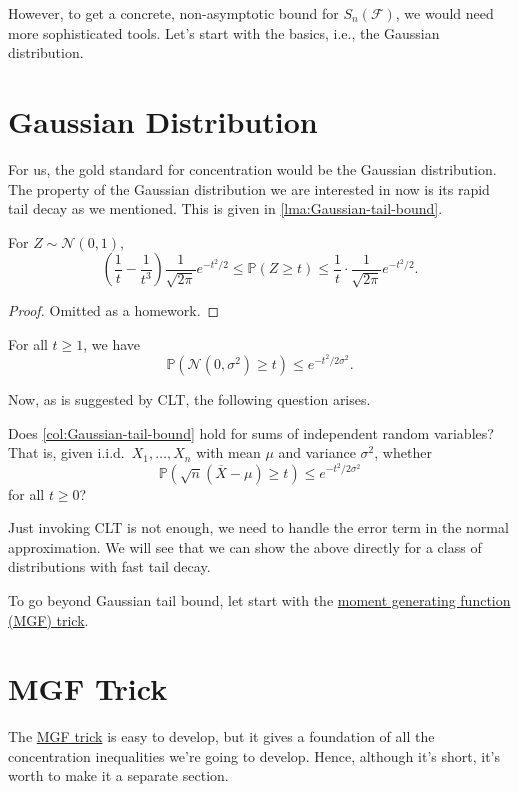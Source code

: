 However, to get a concrete, non-asymptotic bound for \(S_n(\mathscr{F} )\), we would need more sophisticated tools. Let's start with the basics, i.e., the Gaussian distribution.

\section{Gaussian Distribution}
For us, the gold standard for concentration would be the Gaussian distribution. The property of the Gaussian distribution we are interested in now is its rapid tail decay as we mentioned. This is given in \autoref{lma:Gaussian-tail-bound}.

\begin{lemma}\label{lma:Gaussian-tail-bound}
	For \(Z \sim \mathcal{N} (0, 1)\),
	\[
		\left( \frac{1}{t} - \frac{1}{t^3} \right) \frac{1}{\sqrt{2\pi } } e^{- t^2 / 2} \leq \mathbb{P}(Z \geq t) \leq \frac{1}{t} \cdot \frac{1}{\sqrt{2\pi } } e^{- t^2 / 2}.
	\]
\end{lemma}
\begin{proof}
	Omitted as a homework.
\end{proof}
\begin{corollary}\label{col:Gaussian-tail-bound}
	For all \(t \geq 1\), we have
	\[
		\mathbb{P} (\mathcal{N} (0, \sigma ^{2} ) \geq t) \leq e^{-t^2 / 2\sigma ^{2} }.
	\]
\end{corollary}

Now, as is suggested by CLT, the following question arises.

\begin{problem*}
	Does \autoref{col:Gaussian-tail-bound} hold for sums of independent random variables? That is, given i.i.d.\ \(X_1, \dots , X_n\) with mean \(\mu \) and variance \(\sigma ^{2} \), whether
	\[
		\mathbb{P} (\sqrt{n}(\overline{X} - \mu ) \geq t )\leq e^{-t^2 / 2 \sigma ^{2} }
	\]
	for all \(t \geq 0\)?
\end{problem*}
\begin{answer}
	Just invoking CLT is not enough, we need to handle the error term in the normal approximation. We will see that we can show the above directly for a class of distributions with fast tail decay.
\end{answer}

To go beyond Gaussian tail bound, let start with the \hyperref[lma:MGF-trick]{moment generating function (MGF) trick}.

\section{MGF Trick}
The \hyperref[lma:MGF-trick]{MGF trick} is easy to develop, but it gives a foundation of all the concentration inequalities we're going to develop. Hence, although it's short, it's worth to make it a separate section.

